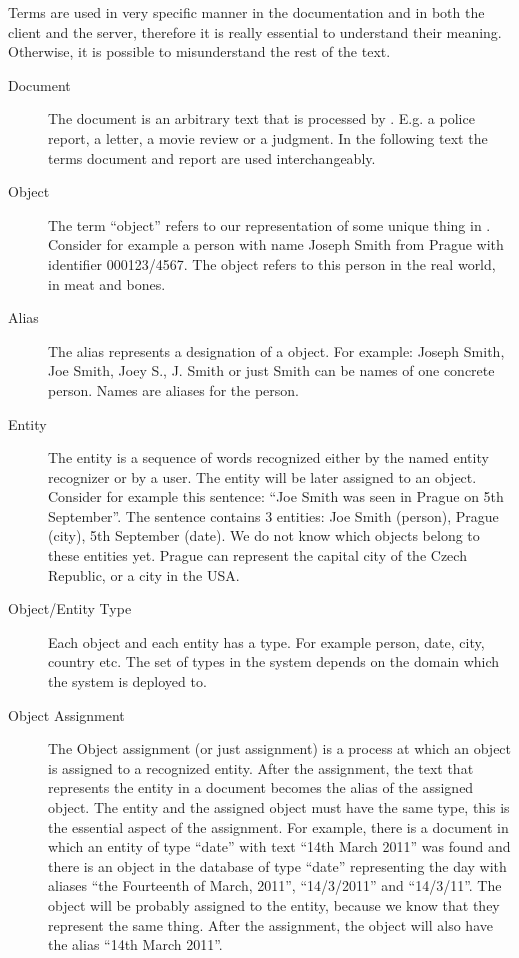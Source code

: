 Terms are used in very specific manner in the documentation and in both the
client and the server, therefore it is really essential to understand their
meaning. Otherwise, it is possible to misunderstand the rest of the text.

\begin{description}
\item[Document]
The document is an arbitrary text that is processed by \textan{}. E.g. a police
report, a letter, a movie review or a judgment. In the following text the terms
document and report are used interchangeably.

\item[Object]
The term ``object'' refers to our representation of some unique thing in
\textan{}. Consider for example a person with name Joseph Smith from Prague with
identifier 000123/4567. The object refers to this person in the real world, in
meat and bones.

\item[Alias]
The alias represents a designation of a object. For example: Joseph Smith, Joe
Smith, Joey S., J. Smith or just Smith can be names of one concrete person.
Names are aliases for the person.

\item[Entity]
The entity is a sequence of words recognized either by the named entity
recognizer or by a user. The entity will be later assigned to an object.
Consider for example this sentence: ``Joe Smith was seen in Prague on 5th
September''. The sentence contains 3 entities: Joe Smith (person), Prague (city),
5th September (date). We do not know which objects belong to these entities yet.
Prague can represent the capital city of the Czech Republic, or a city in the
USA.

\item[Object/Entity Type]
Each object and each entity has a type. For example person, date, city, country
etc. The set of types in the system depends on the domain which the system is
deployed to.

\item[Object Assignment]
The Object assignment (or just assignment) is a process at which an object is
assigned to a recognized entity.  After the assignment, the text that represents
the entity in a document becomes the alias of the assigned object. The entity
and the assigned object must have the same type, this is the essential aspect of
the assignment. For example, there is a document in which an entity of type
``date'' with text ``14th March 2011'' was found and there is an object in the
database of type ``date'' representing the day with aliases ``the Fourteenth of
March, 2011'', ``14/3/2011'' and ``14/3/11''. The object will be probably assigned to
the entity, because we know that they represent the same thing. After the
assignment, the object will also have the alias ``14th March 2011''.


\end{description}
